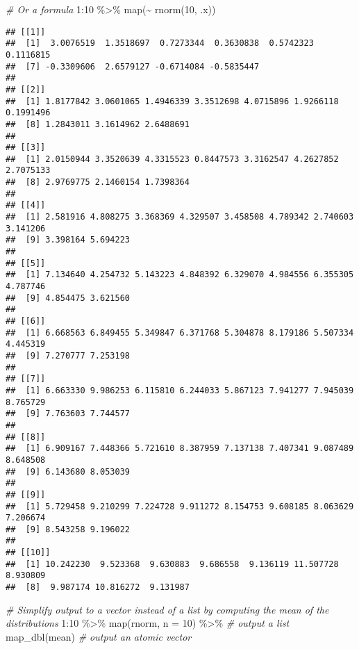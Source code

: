 \documentclass[
]{book}
\newenvironment{Shaded}{\begin{snugshade}}{\end{snugshade}}
\newcommand{\AttributeTok}[1]{\textcolor[rgb]{0.77,0.63,0.00}{#1}}
\newcommand{\CommentTok}[1]{\textcolor[rgb]{0.56,0.35,0.01}{\textit{#1}}}
\newcommand{\DecValTok}[1]{\textcolor[rgb]{0.00,0.00,0.81}{#1}}
\newcommand{\FunctionTok}[1]{\textcolor[rgb]{0.00,0.00,0.00}{#1}}
\newcommand{\NormalTok}[1]{#1}
\newcommand{\SpecialCharTok}[1]{\textcolor[rgb]{0.00,0.00,0.00}{#1}}
\begin{document}
\begin{Shaded}
\begin{Highlighting}[]
\CommentTok{\# Or a formula}
\DecValTok{1}\SpecialCharTok{:}\DecValTok{10} \SpecialCharTok{\%\textgreater{}\%}
  \FunctionTok{map}\NormalTok{(}\SpecialCharTok{\textasciitilde{}} \FunctionTok{rnorm}\NormalTok{(}\DecValTok{10}\NormalTok{, .x))}
\end{Highlighting}
\end{Shaded}

\begin{verbatim}
## [[1]]
##  [1]  3.0076519  1.3518697  0.7273344  0.3630838  0.5742323  0.1116815
##  [7] -0.3309606  2.6579127 -0.6714084 -0.5835447
## 
## [[2]]
##  [1] 1.8177842 3.0601065 1.4946339 3.3512698 4.0715896 1.9266118 0.1991496
##  [8] 1.2843011 3.1614962 2.6488691
## 
## [[3]]
##  [1] 2.0150944 3.3520639 4.3315523 0.8447573 3.3162547 4.2627852 2.7075133
##  [8] 2.9769775 2.1460154 1.7398364
## 
## [[4]]
##  [1] 2.581916 4.808275 3.368369 4.329507 3.458508 4.789342 2.740603 3.141206
##  [9] 3.398164 5.694223
## 
## [[5]]
##  [1] 7.134640 4.254732 5.143223 4.848392 6.329070 4.984556 6.355305 4.787746
##  [9] 4.854475 3.621560
## 
## [[6]]
##  [1] 6.668563 6.849455 5.349847 6.371768 5.304878 8.179186 5.507334 4.445319
##  [9] 7.270777 7.253198
## 
## [[7]]
##  [1] 6.663330 9.986253 6.115810 6.244033 5.867123 7.941277 7.945039 8.765729
##  [9] 7.763603 7.744577
## 
## [[8]]
##  [1] 6.909167 7.448366 5.721610 8.387959 7.137138 7.407341 9.087489 8.648508
##  [9] 6.143680 8.053039
## 
## [[9]]
##  [1] 5.729458 9.210299 7.224728 9.911272 8.154753 9.608185 8.063629 7.206674
##  [9] 8.543258 9.196022
## 
## [[10]]
##  [1] 10.242230  9.523368  9.630883  9.686558  9.136119 11.507728  8.930809
##  [8]  9.987174 10.816272  9.131987
\end{verbatim}

\begin{Shaded}
\begin{Highlighting}[]
\CommentTok{\# Simplify output to a vector instead of a list by computing the mean of the distributions}
\DecValTok{1}\SpecialCharTok{:}\DecValTok{10} \SpecialCharTok{\%\textgreater{}\%}
  \FunctionTok{map}\NormalTok{(rnorm, }\AttributeTok{n =} \DecValTok{10}\NormalTok{) }\SpecialCharTok{\%\textgreater{}\%}  \CommentTok{\# output a list}
  \FunctionTok{map\_dbl}\NormalTok{(mean)           }\CommentTok{\# output an atomic vector}
\end{Highlighting}
\end{Shaded}
\end{document}
